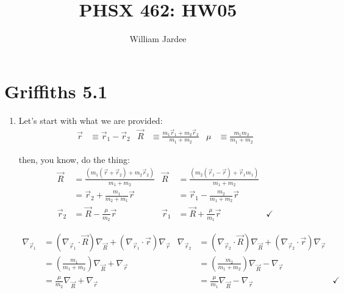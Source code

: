 \documentclass[11pt]{article}
\begin{document}
\title{PHSX 462: HW05}
\author{William Jardee}
\maketitle

\section*{Griffiths 5.1}
\begin{enumerate}[label=\alph*)]
\item
Let's start with what we are provided:
\begin{align*}
\vec{r} &\equiv \vec{r}_1 - \vec{r}_2 & \vec{R} &\equiv \frac{m_1\vec{r}_1 + m_2\vec{r}_2}{m_1 + m_2}   & \mu & \equiv \frac{m_1m_2}{m_1 + m_2}
\end{align*}

then, you know, do the thing:
\begin{align*}
\vec{R} & = \frac{\left(m_1(\vec{r} + \vec{r}_2) + m_2\vec{r}_2\right)}{m_1 + m_2} & \vec{R} & = \frac{\left(m_2(\vec{r}_1 - \vec{r}) + \vec{r}_1 m_1\right)}{m_1 + m_2}\\
& = \vec{r}_2 + \frac{m_1}{m_2 + m_1}\vec{r} & & = \vec{r}_1 - \frac{m_2}{m_1 + m_2}\vec{r}\\
\vec{r}_2 & = \vec{R} - \frac{\mu}{m_2}\vec{r} & \vec{r}_1 & = \vec{R} + \frac{\mu}{m_1}\vec{r} & \checkmark
\end{align*}

\begin{align*}
\nabla_{\vec{r}_1} & = (\nabla_{\vec{r}_1}\cdot \vec{R})\nabla_{\vec{R}} + (\nabla_{\vec{r}_1}\cdot \vec{r})\nabla_{\vec{r}} & \nabla_{\vec{r}_2} & = (\nabla_{\vec{r}_2}\cdot \vec{R})\nabla_{\vec{R}} + (\nabla_{\vec{r}_2}\cdot \vec{r})\nabla_{\vec{r}}\\
& = \left(\frac{m_1}{m_1 + m_2}\right)\nabla_{\vec{R}} + \nabla_{\vec{r}} &  & = \left(\frac{m_2}{m_1+m_2}\right)\nabla_{\vec{R}} - \nabla_{\vec{r}}\\
& = \frac{\mu}{m_2}\nabla_{\vec{R}} + \nabla_{\vec{r}} &  & = \frac{\mu}{m_1}\nabla_{\vec{R}} - \nabla_{\vec{r}} & \checkmark\\
\end{align*}


\end{enumerate}
\end{document}
